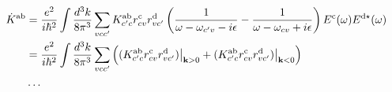 \documentclass{article}
\begin{document}
\begin{align}\label{5.e}
\dot K^{\rma\rmb}
&=
\frac{e^2}{i\hbar^2}
\int\frac{d^3k}{8\pi^3}
\sum_{vcc'}
K^{\rma\rmb}_{c'c}
r^\rmc_{cv}r^\rmd_{vc'}
\left(
\frac{1}{\omega-\omega_{c'v}-i\epsilon}
-
\frac{1}
{\omega-\omega_{cv}+i\epsilon}
\right) 
E^\rmc(\omega)E^{\rmd\star}(\omega) 
\nonumber\\
&=
\frac{e^2}{i\hbar^2}
\int\frac{d^3k}{8\pi^3}
\sum_{vcc'}
\Big(
(K^{\rma\rmb}_{c'c}
r^\rmc_{cv}r^\rmd_{vc'}) \big |_{\bfk>0}
+
(K^{\rma\rmb}_{c'c}
r^\rmc_{cv}r^\rmd_{vc'}) \big |_{\bfk<0}
\Big) 
\nonumber\\
& \ldots \nonumber \\

\end{align}
\end{document}
